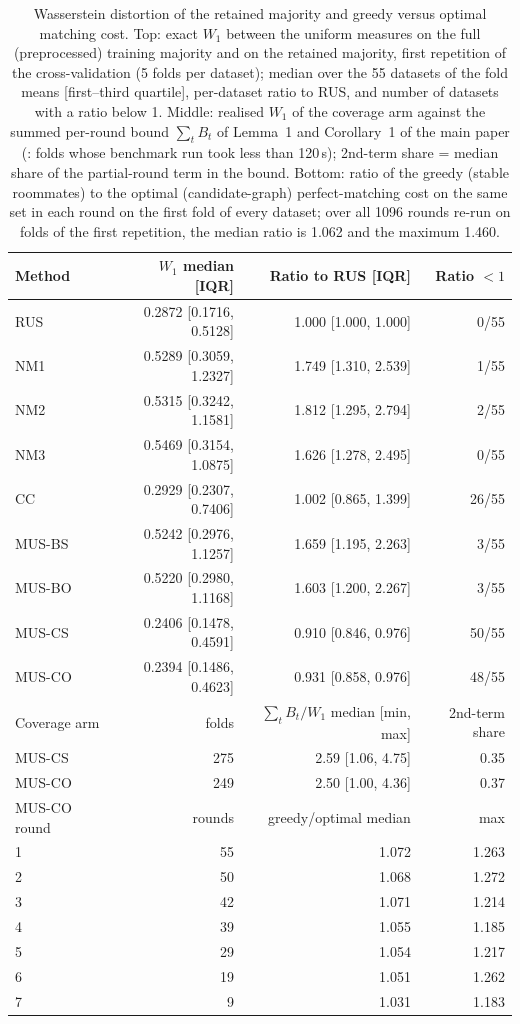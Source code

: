 \begin{table}[!htbp]
\centering
\caption{Wasserstein distortion of the retained majority and greedy versus optimal matching cost. Top: exact $W_1$ between the uniform measures on the full (preprocessed) training majority and on the retained majority, first repetition of the cross-validation (5 folds per dataset); median over the 55 datasets of the fold means [first--third quartile], per-dataset ratio to RUS, and number of datasets with a ratio below 1. Middle: realised $W_1$ of the coverage arm against the summed per-round bound $\sum_t B_t$ of Lemma~1 and Corollary~1 of the main paper (\MUSCO: folds whose benchmark run took less than 120\,s); 2nd-term share = median share of the partial-round term in the bound. Bottom: ratio of the greedy (stable roommates) to the optimal (candidate-graph) perfect-matching cost on the same set in each \MUSCO{} round on the first fold of every dataset; over all 1096 rounds re-run on folds of the first repetition, the median ratio is 1.062 and the maximum 1.460.}
\label{tab:a7a8}
\scriptsize
\setlength{\tabcolsep}{3pt}
\begin{tabular}{lrrr}
\toprule
Method & $W_1$ median [IQR] & Ratio to RUS [IQR] & Ratio $<1$ \\
\midrule
RUS & 0.2872 [0.1716, 0.5128] & 1.000 [1.000, 1.000] & 0/55 \\
NM1 & 0.5289 [0.3059, 1.2327] & 1.749 [1.310, 2.539] & 1/55 \\
NM2 & 0.5315 [0.3242, 1.1581] & 1.812 [1.295, 2.794] & 2/55 \\
NM3 & 0.5469 [0.3154, 1.0875] & 1.626 [1.278, 2.495] & 0/55 \\
CC & 0.2929 [0.2307, 0.7406] & 1.002 [0.865, 1.399] & 26/55 \\
MUS-BS & 0.5242 [0.2976, 1.1257] & 1.659 [1.195, 2.263] & 3/55 \\
MUS-BO & 0.5220 [0.2980, 1.1168] & 1.603 [1.200, 2.267] & 3/55 \\
MUS-CS & 0.2406 [0.1478, 0.4591] & 0.910 [0.846, 0.976] & 50/55 \\
MUS-CO & 0.2394 [0.1486, 0.4623] & 0.931 [0.858, 0.976] & 48/55 \\
\midrule
Coverage arm & folds & $\sum_t B_t / W_1$ median [min, max] & 2nd-term share \\
\midrule
MUS-CS & 275 & 2.59 [1.06, 4.75] & 0.35 \\
MUS-CO & 249 & 2.50 [1.00, 4.36] & 0.37 \\
\midrule
MUS-CO round & rounds & greedy/optimal median & max \\
\midrule
1 & 55 & 1.072 & 1.263 \\
2 & 50 & 1.068 & 1.272 \\
3 & 42 & 1.071 & 1.214 \\
4 & 39 & 1.055 & 1.185 \\
5 & 29 & 1.054 & 1.217 \\
6 & 19 & 1.051 & 1.262 \\
7 & 9 & 1.031 & 1.183 \\
\bottomrule
\end{tabular}
\end{table}
